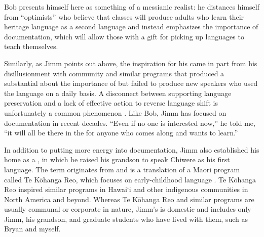 \documentclass[output=paper]{LSP/langsci}
\begin{document}
Bob presents himself here as something of a messianic realist: he distances himself from ``optimists'' who believe that classes will produce adults who learn their heritage language as a second language and instead emphasizes the importance of documentation, which will allow those with a gift for picking up languages to teach themselves. 

Similarly, as Jimm points out above, the inspiration for his  came in part from his disillusionment with community  and similar programs that produced a substantial  about the importance of  but failed to produce new speakers who used the language on a daily basis. A disconnect between  supporting language preservation and a lack of effective action to reverse language shift is unfortunately a common phenomenon \citep[see e.g.][]{DauenhauerDauenhauer1998}. Like Bob, Jimm has focused on documentation in recent decades. ``Even if no one is interested now,'' he told me, ``it will all be there in the  for anyone who comes along and wants to learn.''

In addition to putting more energy into documentation, Jimm also established his home as a , in which he raised his grandson to speak Chiwere as his first language. The term  originates from and is a translation of a M\=aori  program called Te K\=ohanga Reo, which focuses on early-childhood language  \citep{King2008}. Te K\=ohanga Reo inspired similar programs in Hawai`i \citep{Warner2008, WilsonKamana2008} and other indigenous communities in North America and beyond. Whereas Te K\=ohanga Reo and similar programs are usually communal or corporate in nature, Jimm's  is domestic and includes only Jimm, his grandson, and graduate students who have lived with them, such as Bryan and myself.
\end{document}
